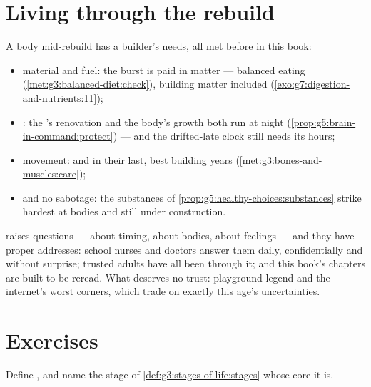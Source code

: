 \section{Living through the rebuild}

\begin{proposition}\label{prop:g8:puberty:care}
A body mid-rebuild has a builder's needs, all met before
in this book:
\begin{itemize}
  \item material and fuel: the burst is paid in matter ---
        balanced eating
        (\cref{met:g3:balanced-diet:check}), building
        matter included
        (\cref{exo:g7:digestion-and-nutrients:11});
  \item {}: the 's renovation and the body's
        growth both run at night
        (\cref{prop:g5:brain-in-command:protect}) --- and
        the drifted-late clock still needs its hours;
  \item movement:  and  in their last, best
        building years
        (\cref{met:g3:bones-and-muscles:care});
  \item and no sabotage: the substances of
        \cref{prop:g5:healthy-choices:substances} strike
        hardest at bodies and  still under
        construction.
\end{itemize}
\end{proposition}
\admitted

\begin{example}\label{ex:g8:puberty:questions}
 raises questions --- about timing, about bodies,
about feelings --- and they have proper addresses: school
nurses and doctors answer them daily, confidentially and
without surprise; trusted adults have all been through
it; and this book's chapters are built to be reread.
What deserves no trust: playground legend and the
internet's worst corners, which trade on exactly this
age's uncertainties.
\end{example}

\section{Exercises}

\begin{exercise}[$\star$]\label{exo:g8:puberty:1}
Define , and name the stage of
\cref{def:g3:stages-of-life:stages} whose core it is.
\end{exercise}

